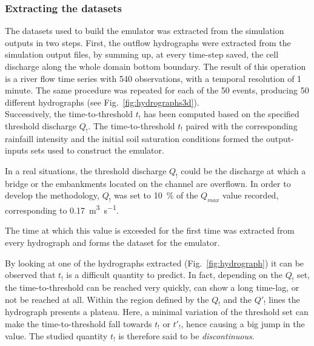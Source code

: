 \subsubsection{Extracting the datasets}
The datasets used to build the emulator was extracted from the simulation outputs in two steps.
First, the outflow hydrographs were extracted from the simulation output files, by summing up, at every time-step saved, the cell discharge along the whole domain bottom boundary. The result of this operation is a river flow time series with \num{540} observations, with a temporal resolution of 1 minute.
The same procedure was repeated for each of the 50 events, producing \num{50} different hydrographs (see Fig.~\ref{fig:hydrographs3d}).\\

Successively, the time-to-threshold $t_!$ has been computed based on the specified threshold discharge $Q_!$. 
The time-to-threshold $t_!$ paired with the corresponding rainfaill intensity and the initial soil saturation conditions formed the output-inputs sets used to construct the emulator. 

In a real situations, the threshold discharge $Q_!$ could be the discharge at which a bridge or the embankments located on the channel are overflown. 
In order to develop the methodology, $Q_!$ was set to \SI{10}{\percent} of the $Q_{max}$ value recorded, corresponding to \SI{0.17}{\cubic\meter\per\second}.

The time at which this value is exceeded for the first time was extracted from every hydrograph and forms the dataset for the emulator.
 
By looking at one of the hydrographs extracted (Fig.~\ref{fig:hydrograph}) it can be observed that $t_!$ is a difficult quantity to predict.
In fact, depending on the $Q_!$ set, the time-to-threshold can be reached very quickly, can show a long time-lag, or not be reached at all.
Within the region defined by the $Q_!$ and the $Q'_!$ lines the hydrograph presents a plateau.
Here, a minimal variation of the threshold set can make the time-to-threshold fall towards $t_!$ or $t'_!$, hence causing a big jump in the value.
The studied quantity $t_!$ is therefore said to be \emph{discontinuous}.

